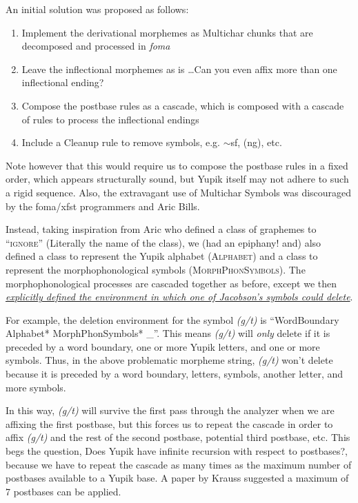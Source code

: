 \documentclass{article}
\begin{document}
\begin{enumerate}
An initial solution was proposed as follows:
\begin{enumerate}[label=\roman*.]
\item Implement the derivational morphemes as Multichar chunks that are decomposed and processed in \textit{foma}
\item Leave the inflectional morphemes as is \ldots Can you even affix more than one inflectional ending?
\item Compose the postbase rules as a cascade, which is composed with a cascade of rules to process the inflectional endings
\item Include a Cleanup rule to remove symbols, e.g. $\sim$sf, (ng), etc.
\end{enumerate}
Note however that this would require us to compose the postbase rules in a fixed order, which appears structurally sound, but Yupik itself may not adhere to such a rigid sequence. Also, the extravagant use of Multichar Symbols was discouraged by the foma/xfst programmers and Aric Bills.

Instead, taking inspiration from Aric who defined a class of graphemes to ``\textsc{ignore}'' (Literally the name of the class), we (had an epiphany! and) also defined a class to represent the Yupik alphabet (\textsc{Alphabet}) and a class to represent the morphophonological symbols (\textsc{MorphPhonSymbols}). The morphophonological processes are cascaded together as before, except we then \textit{\uline{explicitly defined the environment in which one of Jacobson's symbols could delete}}.

For example, the deletion environment for the symbol \textit{(g/t)} is ``WordBoundary Alphabet* MorphPhonSymbols* \_''. This means \textit{(g/t)} will \textit{only} delete if it is preceded by a word boundary, one or more Yupik letters, and one or more symbols. Thus, in the above problematic morpheme string, \textit{(g/t)} won't delete because it is preceded by a word boundary, letters, symbols, another letter, and more symbols.

In this way, \textit{(g/t)} will survive the first pass through the analyzer when we are affixing the first postbase, but this forces us to repeat the cascade in order to affix \textit{(g/t)} and the rest of the second postbase, potential third postbase, etc. This begs the question, Does Yupik have infinite recursion with respect to postbases?, because we have to repeat the cascade as many times as the maximum number of postbases available to a Yupik base.
%
A paper by Krauss suggested a maximum of 7 postbases can be applied.


\end{enumerate}
\end{document}
